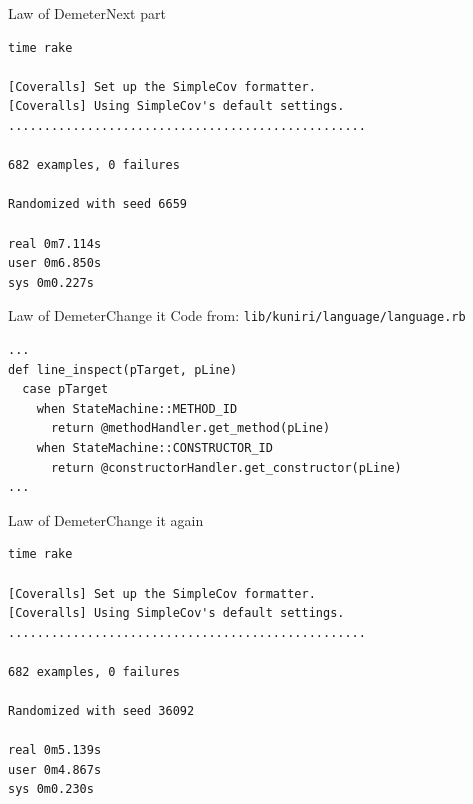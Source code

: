 \documentclass[10pt]{beamer}
\begin{document}
\begin{frame}[fragile]{Law of Demeter}{Next part}
\small
\begin{lstlisting}
time rake

[Coveralls] Set up the SimpleCov formatter.
[Coveralls] Using SimpleCov's default settings.
..................................................

682 examples, 0 failures

Randomized with seed 6659

real 0m7.114s
user 0m6.850s
sys 0m0.227s
\end{lstlisting}
\end{frame}

\begin{frame}[fragile]{Law of Demeter}{Change it}
\small
Code from:
\verb|lib/kuniri/language/language.rb|
\begin{lstlisting}
...
def line_inspect(pTarget, pLine)
  case pTarget
    when StateMachine::METHOD_ID
      return @methodHandler.get_method(pLine)
    when StateMachine::CONSTRUCTOR_ID
      return @constructorHandler.get_constructor(pLine)
...
\end{lstlisting}
\end{frame}

\begin{frame}[fragile]{Law of Demeter}{Change it again}
\small
\begin{lstlisting}
time rake

[Coveralls] Set up the SimpleCov formatter.
[Coveralls] Using SimpleCov's default settings.
..................................................

682 examples, 0 failures

Randomized with seed 36092

real 0m5.139s
user 0m4.867s
sys 0m0.230s
\end{lstlisting}
\end{frame}
\end{document}
